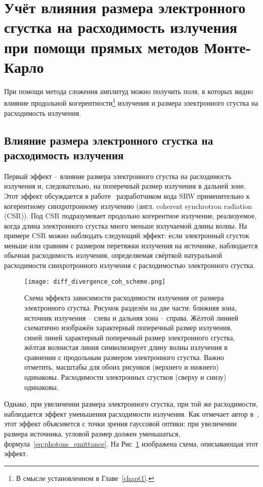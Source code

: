 \section{Учёт влияния размера электронного сгустка на расходимость излучения при помощи прямых методов Монте-Карло}
При помощи метода сложения амплитуд можно получить поля, в которых видно влияние продольной когерентности\footnote{В смысле установленном в Главе~\ref{chapt1}.} излучения и размера электронного сгустка на расходимость излучения.
\subsection{Влияние размера электронного сгустка на расходимость излучения}
Первый эффект -- влияние размера электронного сгустка на расходимость излучения и, следовательно, на поперечный размер излучения в дальней зоне. Этот эффект обсуждается в работе~\cite{chubar_simulation_2006} разработчиком кода SRW применительно к когерентному синхротронному излучению (англ. coherent synchrotron radiation (CSR)). Под CSR подразумевает продольно когерентное излучение, реализуемое, когда длина электронного сгустка много меньше излучаемой длины волны. На примере CSR можно наблюдать следующий эффект: если электронный сгусток меньше или сравним с размером перетяжки излучения на источнике, наблюдается обычная расходимость излучения, определяемая свёрткой натуральной расходимости синхротронного излучения с расходимостью электронного сгустка.
\begin{figure}[H]
	\centering 	\texttt{[image: diff\_divergence\_coh\_scheme.png]}
	\caption{Схема эффекта зависимости расходимости излучения от размера электронного сгустка. Рисунок разделён на две части: ближняя зона, источник излучения -- слева и дальняя зона -- справа. Жёлтой линией схематично изображён характерный поперечный размер излучения, синей линей характерный поперечный размер электронного сгустка, жёлтая волнистая линия символизирует длину волны излучения в сравнении с продольным размером электронного сгустка. Важно отметить, масштабы для обоих рисунков (верхнего и нижнего) одинаковы. Расходимости электронных сгустков (сверху и снизу) одинаковы.}
	\label{fig:diff_divergence_coh_scheme}
\end{figure}
Однако, при увеличении размера электронного сгустка, при той же расходимости, наблюдается эффект уменьшения расходимости излучения. Как отмечает автор в~\cite{chubar_simulation_2006}, этот эффект объясняется с точки зрения гауссовой оптики: при увеличении размера источника, угловой размер должен уменьшаться, формула~\ref{eq:photons_emittance}. На Рис~\ref{fig:diff_divergence_coh_scheme} изображена схема, описывающая этот эффект.

